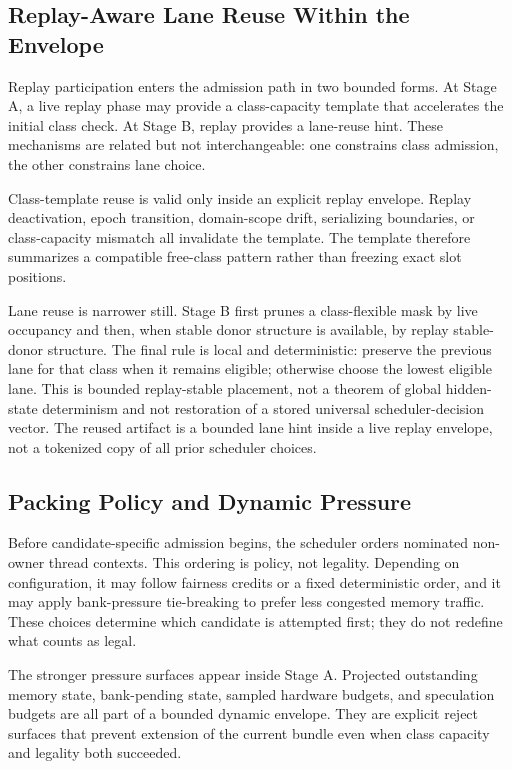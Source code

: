 \documentclass[twocolumn]{article}
\begin{document}
\subsection{Replay-Aware Lane Reuse Within the Envelope}

Replay participation enters the admission path in two bounded forms. At Stage A, a live replay phase may provide a class-capacity template that accelerates the initial class check. At Stage B, replay provides a lane-reuse hint. These mechanisms are related but not interchangeable: one constrains class admission, the other constrains lane choice.

Class-template reuse is valid only inside an explicit replay envelope. Replay deactivation, epoch transition, domain-scope drift, serializing boundaries, or class-capacity mismatch all invalidate the template. The template therefore summarizes a compatible free-class pattern rather than freezing exact slot positions.

Lane reuse is narrower still. Stage B first prunes a class-flexible mask by live occupancy and then, when stable donor structure is available, by replay stable-donor structure. The final rule is local and deterministic: preserve the previous lane for that class when it remains eligible; otherwise choose the lowest eligible lane. This is bounded replay-stable placement, not a theorem of global hidden-state determinism and not restoration of a stored universal scheduler-decision vector. The reused artifact is a bounded lane hint inside a live replay envelope, not a tokenized copy of all prior scheduler choices.


\subsection{Packing Policy and Dynamic Pressure}

Before candidate-specific admission begins, the scheduler orders nominated non-owner thread contexts. This ordering is policy, not legality. Depending on configuration, it may follow fairness credits or a fixed deterministic order, and it may apply bank-pressure tie-breaking to prefer less congested memory traffic. These choices determine which candidate is attempted first; they do not redefine what counts as legal.

The stronger pressure surfaces appear inside Stage A. Projected outstanding memory state, bank-pending state, sampled hardware budgets, and speculation budgets are all part of a bounded dynamic envelope. They are explicit reject surfaces that prevent extension of the current bundle even when class capacity and legality both succeeded.
\end{document}
